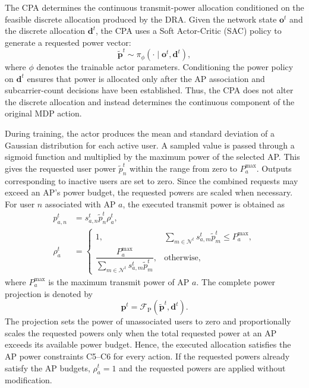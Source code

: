 \documentclass[journal]{IEEEtran}
\begin{document}
The CPA determines the continuous transmit-power allocation
conditioned on the feasible discrete allocation produced by the DRA.
Given the network state $\mathbf{o}^{t}$ and the discrete allocation
$\mathbf{d}^{t}$, the CPA uses a Soft Actor-Critic (SAC) policy to
generate a requested power vector:
\begin{equation}
    \widetilde{\mathbf{p}}^{t}
    \sim
    \pi_{\phi}
    \left(
    \cdot\mid\mathbf{o}^{t},\mathbf{d}^{t}
    \right),
    \label{eq:conditional_sac_policy}
\end{equation}
where $\phi$ denotes the trainable actor parameters. Conditioning the
power policy on $\mathbf{d}^{t}$ ensures that power is allocated only
after the AP association and subcarrier-count decisions have been
established. Thus, the CPA does not alter the discrete allocation and
instead determines the continuous component of the original MDP
action.

During training, the actor produces the mean and standard
deviation of a Gaussian distribution for each active user.
A sampled value is passed through a sigmoid function and
multiplied by the maximum power of the selected AP. This
gives the requested user power $\widetilde{p}_n^t$ within
the range from zero to $P_a^{\max}$. Outputs corresponding
to inactive users are set to zero. Since the combined
requests may exceed an AP's power budget, the requested
powers are scaled when necessary. For user $n$ associated
with AP $a$, the executed transmit power is obtained as
\begin{align}
p_{a,n}^{t}
&=
s_{a,n}^{t}
\widetilde{p}_{n}^{t}
\rho_{a}^{t},
\label{eq:power_projection}\\
\rho_{a}^{t}
&=
\begin{cases}
1,
& \displaystyle
\sum_{m\in\mathcal{N}^{t}}
s_{a,m}^{t}\widetilde{p}_{m}^{t}
\leq P_a^{\max},\\[3mm]
\dfrac{P_a^{\max}}
{\displaystyle
\sum_{m\in\mathcal{N}^{t}}
s_{a,m}^{t}\widetilde{p}_{m}^{t}},
& \text{otherwise},
\end{cases}
\label{eq:ap_power_scaling}
\end{align}
where $P_a^{\max}$ is the maximum transmit power of AP $a$.
The complete power projection is denoted by
\begin{equation}
\mathbf{p}^{t}
=
\mathcal{F}_{\mathrm{P}}
\left(
\widetilde{\mathbf{p}}^{t},
\mathbf{d}^{t}
\right).
\label{eq:power_feasibility_layer}
\end{equation}
The projection sets the power of unassociated users to zero and
proportionally scales the requested powers only when the total
requested power at an AP exceeds its available power budget. Hence,
the executed allocation satisfies the AP power constraints C5--C6
for every action. If the requested powers already satisfy the AP
budgets, $\rho_a^t=1$ and the requested powers are applied without
modification.
\end{document}
